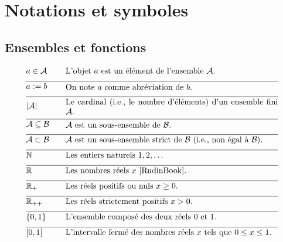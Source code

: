 
\section*{Notations et symboles}

\vspace*{-2mm}
\subsection*{Ensembles et fonctions} 

\begin{align} 
	&a \in \mathcal{A} & \quad & \parbox{.75\textwidth}{L'objet $a$ est un élément de l'ensemble $\mathcal{A}$.} \nonumber \\[2mm] \hline \nonumber\\[-5mm]
	&a \defeq b & \quad & \parbox{.75\textwidth}{On note $a$ comme abréviation de $b$.} \nonumber \\[2mm] \hline \nonumber\\[-5mm]
	&|\mathcal{A}| & \quad & \parbox{.75\textwidth}{Le cardinal (i.e., le nombre d'éléments) d'un ensemble fini $\mathcal{A}$.} \nonumber \\[2mm] \hline \nonumber\\[-5mm]
	&\mathcal{A} \subseteq \mathcal{B}& \quad & \parbox{.75\textwidth}{$\mathcal{A}$ est un sous-ensemble de $\mathcal{B}$.} \nonumber \\[2mm] \hline \nonumber\\[-5mm]
	&\mathcal{A} \subset \mathcal{B}& \quad & \parbox{.75\textwidth}{$\mathcal{A}$ est un sous-ensemble strict de $\mathcal{B}$ (i.e., non égal à $\mathcal{B}$).} \nonumber \\[2mm] \hline \nonumber\\[-5mm]
	&\mathbb{N} & \quad & \parbox{.75\textwidth}{Les entiers naturels $1,2,\ldots$} \nonumber \\[2mm] \hline \nonumber\\[-5mm]
	&\mathbb{R}  &\quad &\parbox{.75\textwidth}{Les nombres réels $x$ \cite{RudinBook}.} \nonumber \\[2mm] \hline \nonumber\\[-5mm]
	&\mathbb{R}_{+}  &\quad &\parbox{.75\textwidth}{Les réels positifs ou nuls $x\geq0$.} \nonumber \\[2mm] \hline \nonumber\\[-5mm]
	&\mathbb{R}_{++}  &\quad &\parbox{.75\textwidth}{Les réels strictement positifs $x> 0$.} \nonumber \\[2mm] \hline \nonumber\\[-5mm]
	&\{0,1\}& \quad & \parbox{.75\textwidth}{L'ensemble composé des deux réels $0$ et $1$.} \nonumber \\[2mm] \hline \nonumber\\[-5mm]
	&[0,1] &\quad &\parbox{.75\textwidth}{L'intervalle fermé des nombres réels $x$ tels que $0 \leq x \leq 1$.} \nonumber
\end{align} 

